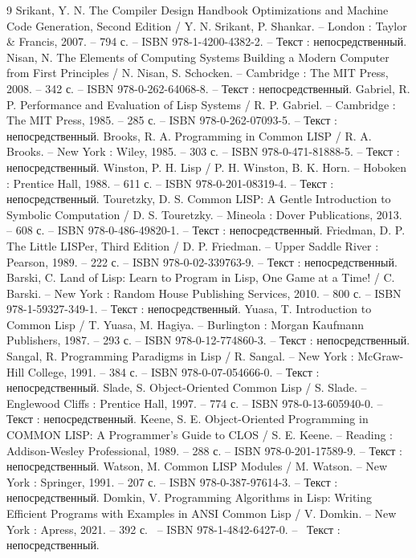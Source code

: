\begin{thebibliography}{9}
 Srikant, Y. N. The Compiler Design Handbook Optimizations and Machine Code Generation, Second Edition / Y. N. Srikant, P. Shankar. -- London : Taylor \& Francis, 2007. -- 794 с. -- ISBN 978-1-4200-4382-2. -- Текст : непосредственный.
 Nisan, N. The Elements of Computing Systems Building a Modern Computer from First Principles / N. Nisan, S. Schocken. -- Cambridge : The MIT Press, 2008. -- 342 с. -- ISBN 978-0-262-64068-8. -- Текст : непосредственный.
 Gabriel, R. P. Performance and Evaluation of Lisp Systems / R. P. Gabriel. -- Cambridge : The MIT Press, 1985. -- 285 с. -- ISBN 978-0-262-07093-5. -- Текст : непосредственный.
 Brooks, R. A. Programming in Common LISP / R. A. Brooks. -- New York : Wiley, 1985. -- 303 с. -- ISBN 978-0-471-81888-5. -- Текст : непосредственный.
 Winston, P. H. Lisp / P. H. Winston, B. K. Horn. -- Hoboken : Prentice Hall, 1988. -- 611 с. -- ISBN 978-0-201-08319-4. -- Текст : непосредственный.
 Touretzky, D. S. Common LISP: A Gentle Introduction to Symbolic Computation / D. S. Touretzky. -- Mineola : Dover Publications, 2013. -- 608 с. -- ISBN 978-0-486-49820-1. -- Текст : непосредственный.
 Friedman, D. P. The Little LISPer, Third Edition / D. P. Friedman. -- Upper Saddle River : Pearson, 1989. -- 222 с. -- ISBN 978-0-02-339763-9. -- Текст : непосредственный.
 Barski, C. Land of Lisp: Learn to Program in Lisp, One Game at a Time! / C. Barski. -- New York : Random House Publishing Services, 2010. -- 800 с. -- ISBN 978-1-59327-349-1. -- Текст : непосредственный.
 Yuasa, T. Introduction to Common Lisp / T. Yuasa, M. Hagiya. -- Burlington : Morgan Kaufmann Publishers, 1987. -- 293 с. -- ISBN 978-0-12-774860-3. -- Текст : непосредственный.
 Sangal, R. Programming Paradigms in Lisp / R. Sangal. -- New York : McGraw-Hill College, 1991. -- 384 с. -- ISBN 978-0-07-054666-0. -- Текст : непосредственный.
 Slade, S. Object-Oriented Common Lisp / S. Slade. -- Englewood Cliffs : Prentice Hall, 1997. -- 774 с. -- ISBN 978-0-13-605940-0. -- Текст : непосредственный.
 Keene, S. E. Object-Oriented Programming in COMMON LISP: A Programmer's Guide to CLOS / S. E. Keene. -- Reading : Addison-Wesley Professional, 1989. -- 288 с. -- ISBN 978-0-201-17589-9. -- Текст : непосредственный.
 Watson, M. Common LISP Modules / M. Watson. -- New York : Springer, 1991. -- 207 с. -- ISBN 978-0-387-97614-3. -- Текст : непосредственный.
 Domkin, V. Programming Algorithms in Lisp: Writing Efficient Programs with Examples in ANSI Common Lisp / V. Domkin. -- New York : Apress, 2021. -- 392 с. ~-- ISBN 978-1-4842-6427-0. -- ~Текст : непосредственный.

\end{thebibliography}
